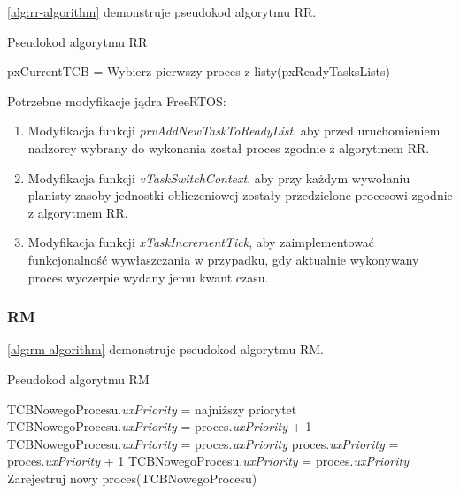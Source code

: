 \documentclass[../../main]{subfiles}
\begin{document}
\cref{alg:rr-algorithm} demonstruje pseudokod algorytmu RR.

\begin{algorithm}
\caption{Pseudokod algorytmu RR}\label{alg:rr-algorithm}
\begin{algorithmic}[1]
    \State pxCurrentTCB = Wybierz pierwszy proces z listy(pxReadyTasksLists)
\EndIf
\end{algorithmic}
\end{algorithm}

Potrzebne modyfikacje jądra FreeRTOS:

\begin{enumerate}
    \item Modyfikacja funkcji \textit{prvAddNewTaskToReadyList}, aby przed uruchomieniem nadzorcy wybrany do wykonania został proces zgodnie z algorytmem RR.
    \item Modyfikacja funkcji \textit{vTaskSwitchContext}, aby przy każdym wywołaniu planisty zasoby jednostki obliczeniowej zostały przedzielone procesowi zgodnie z algorytmem RR.
    \item Modyfikacja funkcji \textit{xTaskIncrementTick}, aby zaimplementować funkcjonalność wywłaszczania w przypadku, gdy aktualnie wykonywany proces wyczerpie wydany jemu kwant czasu.
\end{enumerate}

\subsubsection{RM}

\cref{alg:rm-algorithm} demonstruje pseudokod algorytmu RM.

\begin{algorithm}
\caption{Pseudokod algorytmu RM}\label{alg:rm-algorithm}
\begin{algorithmic}[1]
    \State TCBNowegoProcesu.\textit{uxPriority} = najniższy priorytet
\Else
            \State TCBNowegoProcesu.\textit{uxPriority} = proces.\textit{uxPriority} + 1
            \State TCBNowegoProcesu.\textit{uxPriority} = proces.\textit{uxPriority}
            \State proces.\textit{uxPriority} = proces.\textit{uxPriority} + 1
        \Else
            \State TCBNowegoProcesu.\textit{uxPriority} = proces.\textit{uxPriority}
        \EndIf
    \EndFor
\EndIf
\State Zarejestruj nowy proces(TCBNowegoProcesu)
\end{algorithmic}
\end{algorithm}
\end{document}
